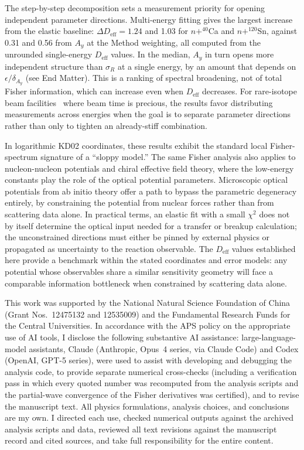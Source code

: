 \documentclass[aps,prl,reprint,superscriptaddress,showpacs,floatfix]{revtex4-2}
\begin{document}
The step-by-step decomposition sets a measurement priority for opening independent parameter directions. Multi-energy fitting gives the largest increase from the elastic baseline: $\Delta D_\mathrm{eff} = 1.24$ and 1.03 for $n+^{40}$Ca and $n+^{120}$Sn, against 0.31 and 0.56 from $A_y$ at the Method weighting, all computed from the unrounded single-energy $D_\mathrm{eff}$ values. In the median, $A_y$ in turn opens more independent structure than $\sigma_R$ at a single energy, by an amount that depends on $\epsilon/\delta_{A_y}$ (see End Matter). This is a ranking of spectral broadening, not of total Fisher information, which can increase even when $D_\mathrm{eff}$ decreases. For rare-isotope beam facilities~\cite{Hebborn2023,Hebborn2023PRL} where beam time is precious, the results favor distributing measurements across energies when the goal is to separate parameter directions rather than only to tighten an already-stiff combination.

In logarithmic KD02 coordinates, these results exhibit the standard local Fisher-spectrum signature of a ``sloppy model.'' The same Fisher analysis also applies to nucleon-nucleon potentials and chiral effective field theory, where the low-energy constants play the role of the optical potential parameters. Microscopic optical potentials from ab initio theory offer a path to bypass the parametric degeneracy entirely, by constraining the potential from nuclear forces rather than from scattering data alone. In practical terms, an elastic fit with a small $\chi^2$ does not by itself determine the optical input needed for a transfer or breakup calculation; the unconstrained directions must either be pinned by external physics or propagated as uncertainty to the reaction observable. The $D_\mathrm{eff}$ values established here provide a benchmark within the stated coordinates and error models: any potential whose observables share a similar sensitivity geometry will face a comparable information bottleneck when constrained by scattering data alone.

\begin{acknowledgments}
This work was supported by the National Natural Science Foundation of China (Grant Nos.~12475132 and 12535009) and the Fundamental Research Funds for the Central Universities. In accordance with the APS policy on the appropriate use of AI tools, I disclose the following substantive AI assistance: large-language-model assistants, Claude (Anthropic, Opus~4 series, via Claude Code) and Codex (OpenAI, GPT-5 series), were used to assist with developing and debugging the analysis code, to provide separate numerical cross-checks (including a verification pass in which every quoted number was recomputed from the analysis scripts and the partial-wave convergence of the Fisher derivatives was certified), and to revise the manuscript text. All physics formulations, analysis choices, and conclusions are my own. I directed each use, checked numerical outputs against the archived analysis scripts and data, reviewed all text revisions against the manuscript record and cited sources, and take full responsibility for the entire content.
\end{acknowledgments}
\end{document}
